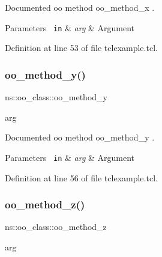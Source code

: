 Documented oo method {\ttfamily oo\+\_\+method\+\_\+x} . 


\begin{DoxyParams}[1]{Parameters}
\mbox{\texttt{ in}}  & {\em arg} & Argument \\
\hline
\end{DoxyParams}


Definition at line 53 of file tclexample.\+tcl.


\begin{DoxyCode}{0}

\end{DoxyCode}
\mbox{\label{classns_1_1oo__class_ad07feb192f34010ed66d123338c7acdd}} 
\subsubsection{\texorpdfstring{oo\_method\_y()}{oo\_method\_y()}}
{\footnotesize\ttfamily ns\+::oo\+\_\+class\+::oo\+\_\+method\+\_\+y\begin{DoxyParamCaption}\item[{}]{arg  }\end{DoxyParamCaption}\hspace{0.3cm}{\ttfamily [protected]}}



Documented oo method {\ttfamily oo\+\_\+method\+\_\+y} . 


\begin{DoxyParams}[1]{Parameters}
\mbox{\texttt{ in}}  & {\em arg} & Argument \\
\hline
\end{DoxyParams}


Definition at line 56 of file tclexample.\+tcl.


\begin{DoxyCode}{0}

\end{DoxyCode}
\mbox{\label{classns_1_1oo__class_a8a3cfbae3b3fca463f08adb9174a5fe8}} 
\subsubsection{\texorpdfstring{oo\_method\_z()}{oo\_method\_z()}}
{\footnotesize\ttfamily ns\+::oo\+\_\+class\+::oo\+\_\+method\+\_\+z\begin{DoxyParamCaption}\item[{}]{arg  }\end{DoxyParamCaption}}



